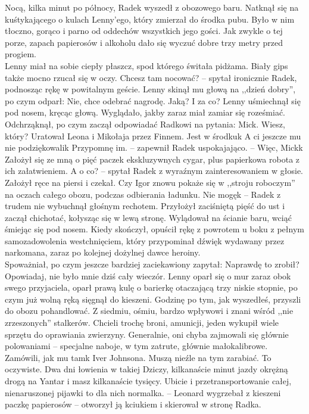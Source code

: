 \documentclass[../MAIN.tex]{subfiles}
\begin{document}
\qd
% 
% 
% 
% 
Nocą, kilka minut po północy, Radek wyszedł z obozowego baru. Natknął się na kuśtykającego o kulach Lenny’ego, który zmierzał do środka pubu. Było w nim tłoczno, gorąco i parno od oddechów wszystkich jego gości. Jak zwykle o tej porze, zapach papierosów i alkoholu dało się wyczuć dobre trzy metry przed progiem.\\
Lenny miał na sobie ciepły płaszcz, spod którego świtała pidżama. Biały gips także mocno rzucał się w oczy.
\sx Chcesz tam nocować? -- spytał ironicznie Radek, podnosząc rękę w powitalnym geście.
\qd
Lenny skinął mu głową na ,,dzień dobry'', po czym odparł:
\sx Nie, chce odebrać nagrodę.
\xx Jaką? I za co?
\qd
Lenny uśmiechnął się pod nosem, kręcąc głową. Wyglądało, jakby zaraz miał zamiar się roześmiać. Odchrząknął, po czym zaczął odpowiadać Radkowi na pytania:
\sx Mick. Wiesz, który?
\xx Uratował Leona i Mikołaja przez Finnem. Jest w środku\3k
\xx A ci jeszcze mu nie podziękowali\3k
\xx Przypomnę im. -- zapewnił Radek uspokajająco. -- Więc, Mick\3k
\xx Założył się ze mną o pięć paczek ekskluzywnych cygar, plus papierkowa robota z ich załatwieniem.
\xx A o co? -- spytał Radek z wyraźnym zainteresowaniem w głosie. Założył ręce na piersi i czekał.
\xx Czy Igor znowu pokaże się w ,,stroju roboczym'' na oczach całego obozu, podczas odbierania ładunku.
\xx Nie mogę\3k -- Radek z trudem nie wybuchnął głośnym rechotem.
\qd
Przyłożył zaciśniętą pięść do ust i zaczął chichotać, kołysząc się w lewą stronę. Wylądował na ścianie baru, wciąć śmiejąc się pod nosem. Kiedy skończył, opuścił rękę z powrotem u boku z pełnym samozadowolenia westchnięciem, który przypominał dźwięk wydawany przez narkomana, zaraz po kolejnej dożylnej dawce heroiny.\\
Spoważniał, po czym jeszcze bardziej zaciekawiony zapytał:
\sx Naprawdę to zrobił? Opowiadaj, nie było mnie dziś cały wieczór.
\qd
Lenny oparł się o mur zaraz obok swego przyjaciela, oparł prawą kulę o barierkę otaczającą trzy niskie stopnie, po czym już wolną ręką sięgnął do kieszeni.
\sx Godzinę po tym, jak wyszedłeś, przyszli do obozu pohandlować. Z siedmiu, ośmiu, bardzo wpływowi i znani wśród ,,nie zrzeszonych'' stalkerów. Chcieli trochę broni, amunicji, jeden wykupił wiele sprzętu do oprawiania zwierzyny. Generalnie, oni chyba zajmowali się głównie polowaniami -- specjalne naboje, w tym zatrute, głównie małokalibrowe. Zamówili, jak mu tam\3k Iver Johnsona.
\xx Muszą nieźle na tym zarabiać.
\xx To oczywiste. Dwa dni łowienia w takiej Dziczy, kilkanaście minut jazdy okrężną drogą na Yantar i masz kilkanaście tysięcy. Ubicie i przetransportowanie całej, nienaruszonej pijawki to dla nich normalka. -- Leonard wygrzebał z kieszeni paczkę papierosów -- otworzył ją kciukiem i skierował w stronę Radka.
\end{document}
